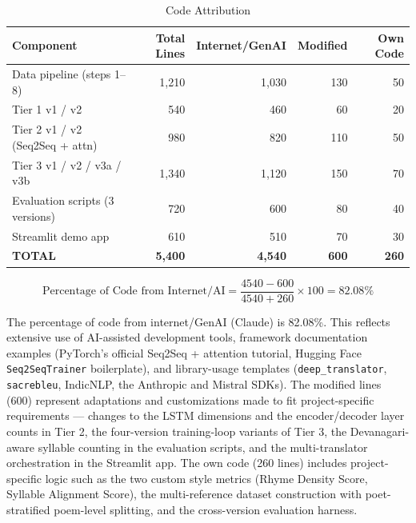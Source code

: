 \documentclass[11pt]{article}
\begin{document}
\begin{table}[h]
\centering
\caption{Code Attribution}
\label{tab:attr}
\setlength{\tabcolsep}{5pt}
\begin{tabular}{lrrrr}
\toprule
\textbf{Component} & \textbf{Total Lines} & \textbf{Internet/GenAI} & \textbf{Modified} & \textbf{Own Code} \\
\midrule
Data pipeline (steps 1--8)         & 1{,}210 & 1{,}030 & 130 & 50  \\
Tier 1 v1 / v2                     & 540    & 460    & 60  & 20 \\
Tier 2 v1 / v2 (Seq2Seq + attn)    & 980    & 820    & 110 & 50 \\
Tier 3 v1 / v2 / v3a / v3b         & 1{,}340 & 1{,}120 & 150 & 70 \\
Evaluation scripts (3 versions)    & 720    & 600    & 80  & 40 \\
Streamlit demo app                 & 610    & 510    & 70  & 30 \\
\midrule
\textbf{TOTAL}                     & \textbf{5{,}400} & \textbf{4{,}540} & \textbf{600} & \textbf{260} \\
\bottomrule
\end{tabular}
\end{table}

\begin{equation}
\text{Percentage of Code from Internet/AI} = \frac{4540 - 600}{4540 + 260} \times 100 = 82.08\%
\end{equation}

The percentage of code from internet/GenAI (Claude) is 82.08\%. This reflects extensive use of AI-assisted development tools, framework documentation examples (PyTorch's official Seq2Seq + attention tutorial, Hugging Face \texttt{Seq2SeqTrainer} boilerplate), and library-usage templates (\texttt{deep\_translator}, \texttt{sacrebleu}, IndicNLP, the Anthropic and Mistral SDKs). The modified lines (600) represent adaptations and customizations made to fit project-specific requirements --- changes to the LSTM dimensions and the encoder/decoder layer counts in Tier 2, the four-version training-loop variants of Tier 3, the Devanagari-aware syllable counting in the evaluation scripts, and the multi-translator orchestration in the Streamlit app. The own code (260 lines) includes project-specific logic such as the two custom style metrics (Rhyme Density Score, Syllable Alignment Score), the multi-reference dataset construction with poet-stratified poem-level splitting, and the cross-version evaluation harness.
\end{document}
